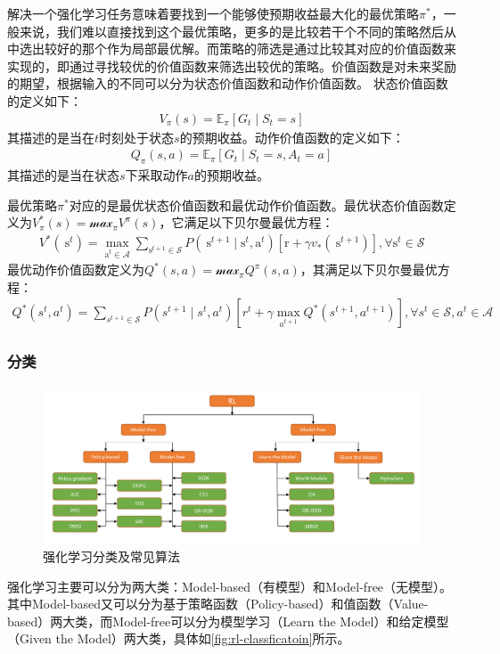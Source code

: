     解决一个强化学习任务意味着要找到一个能够使预期收益最大化的最优策略$\pi^*$，一般来说，我们难以直接找到这个最优策略，更多的是比较若干个不同的策略然后从中选出较好的那个作为局部最优解。而策略的筛选是通过比较其对应的价值函数来实现的，即通过寻找较优的价值函数来筛选出较优的策略。价值函数是对未来奖励的期望，根据输入的不同可以分为状态价值函数和动作价值函数。
状态价值函数的定义如下：
\begin{align}
    V_{\pi}(s)=\mathbb{E}_{\pi}\left[G_{t} \mid S_{t}=s\right]
\end{align}
其描述的是当在$t$时刻处于状态$s$的预期收益。动作价值函数的定义如下：
\begin{align}
    Q_{\pi}(s, a)=\mathbb{E}_{\pi}\left[G_{t} \mid S_{t}=s, A_{t}=a\right]
\end{align}
其描述的是当在状态$s$下采取动作$a$的预期收益。

最优策略$\pi^{*}$对应的是最优状态价值函数和最优动作价值函数。最优状态价值函数定义为$V_{\pi}^*(s)=\mathcal{max}_{\pi}V^{\pi}(s)$，它满足以下贝尔曼最优方程：
\begin{align}
    V^{*}\left(\mathrm{~s}^{t}\right)=\max _{\mathrm{a}^{t} \in \mathcal{A}} \sum_{\mathrm{s}^{t+1} \in \mathcal{S}} P\left(\mathrm{~s}^{t+1} \mid \mathrm{s}^{t}, \mathrm{a}^{t}\right)\left[\mathrm{r}+\gamma v_{*}\left(\mathrm{~s}^{t+1}\right)\right], \forall \mathrm{s}^{t} \in \mathcal{S}
\end{align}
最优动作价值函数定义为$Q^*(s,a)=\mathcal{max}_{\pi}Q^{\pi}(s,a)$，其满足以下贝尔曼最优方程：
\begin{align}
    Q^{*}\left(s^{t}, a^{t}\right)=\sum_{s^{t+1} \in \mathcal{S}} P\left(s^{t+1} \mid s^{t}, a^{t}\right)\left[r^{t}+\gamma \max _{a^{t+1}} Q^{*}\left(s^{t+1}, a^{t+1}\right)\right], \forall s^{t} \in \mathcal{S}, a^{t} \in \mathcal{A}
\end{align}

\subsubsection{分类}
\begin{figure}[htb]
    \includegraphics[width=1.0\textwidth]{fig/rl-classfication.pdf}
    \caption{强化学习分类及常见算法}
    \label{fig:rl-classficatoin}
\end{figure}
强化学习主要可以分为两大类：Model-based（有模型）和Model-free（无模型）。其中Model-based又可以分为基于策略函数（Policy-based）和值函数（Value-based）两大类，而Model-free可以分为模型学习（Learn the Model）和给定模型（Given the Model）两大类，具体如\autoref{fig:rl-classficatoin}所示。

